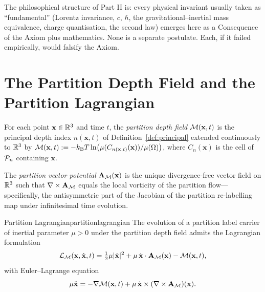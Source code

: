 The philosophical structure of Part II is: every physical invariant usually taken as ``fundamental'' (Lorentz invariance, $c$, $\hbar$, the gravitational--inertial mass equivalence, charge quantisation, the second law) emerges here as a Consequence of the Axiom plus mathematics. None is a separate postulate. Each, if it failed empirically, would falsify the Axiom.

\section{The Partition Depth Field and the Partition Lagrangian}
\label{sec:partitionlagrangian}

\begin{definition}
\label{def:depthfield}
For each point $\mathbf{x}\in\mathbb{R}^{3}$ and time $t$, the \emph{partition depth field} $\mathcal{M}(\mathbf{x},t)$ is the principal depth index $n(\mathbf{x},t)$ of Definition~\ref{def:principal} extended continuously to $\mathbb{R}^{3}$ by $\mathcal{M}(\mathbf{x},t):=-k_{\mathrm{B}} T\ln(\mu(C_{n(\mathbf{x},t)}(\mathbf{x}))/\mu(\Omega))$, where $C_{n}(\mathbf{x})$ is the cell of $\mathcal{P}_{n}$ containing $\mathbf{x}$.
\end{definition}

\begin{definition}
\label{def:partitionA}
The \emph{partition vector potential} $\mathbf{A}_{\mathcal{M}}(\mathbf{x})$ is the unique divergence-free vector field on $\mathbb{R}^{3}$ such that $\nabla\times\mathbf{A}_{\mathcal{M}}$ equals the local vorticity of the partition flow---specifically, the antisymmetric part of the Jacobian of the partition re-labelling map under infinitesimal time evolution.
\end{definition}

\begin{consequence}{Partition Lagrangian}{partitionlagrangian}
The evolution of a partition label carrier of inertial parameter $\mu>0$ under the partition depth field admits the Lagrangian formulation
\begin{equation}
\mathcal{L}_{\mathcal{M}}(\mathbf{x},\dot{\mathbf{x}},t)=\tfrac{1}{2}\mu|\dot{\mathbf{x}}|^{2}+\mu\,\dot{\mathbf{x}}\cdot\mathbf{A}_{\mathcal{M}}(\mathbf{x})-\mathcal{M}(\mathbf{x},t),
\label{eq:partitionlagrangian}
\end{equation}
with Euler--Lagrange equation
\begin{equation}
\mu\ddot{\mathbf{x}}=-\nabla\mathcal{M}(\mathbf{x},t)+\mu\,\dot{\mathbf{x}}\times(\nabla\times\mathbf{A}_{\mathcal{M}})(\mathbf{x}).
\label{eq:partitionel}
\end{equation}
\end{consequence}

